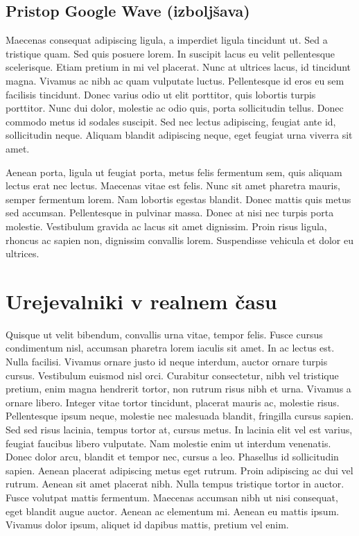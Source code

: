 \documentclass[a4paper, 12pt, twoside]{book}
\begin{document}
\section{Pristop Google Wave (izboljšava)	}

Maecenas consequat adipiscing ligula, a imperdiet ligula tincidunt ut. Sed a tristique quam. Sed quis posuere lorem. In suscipit lacus eu velit pellentesque scelerisque. Etiam pretium in mi vel placerat. Nunc at ultrices lacus, id tincidunt magna. Vivamus ac nibh ac quam vulputate luctus. Pellentesque id eros eu sem facilisis tincidunt. Donec varius odio ut elit porttitor, quis lobortis turpis porttitor. Nunc dui dolor, molestie ac odio quis, porta sollicitudin tellus. Donec commodo metus id sodales suscipit. Sed nec lectus adipiscing, feugiat ante id, sollicitudin neque. Aliquam blandit adipiscing neque, eget feugiat urna viverra sit amet.

Aenean porta, ligula ut feugiat porta, metus felis \cite{gdocs} fermentum sem, quis aliquam lectus erat nec lectus. Maecenas vitae est felis. Nunc sit amet pharetra mauris, semper fermentum lorem. Nam lobortis egestas blandit. Donec mattis quis metus sed accumsan. Pellentesque in pulvinar massa. Donec at nisi nec turpis porta molestie. Vestibulum gravida ac lacus sit amet dignissim. Proin risus ligula, rhoncus ac sapien non, dignissim convallis lorem. Suspendisse vehicula et dolor eu ultrices.

\chapter{Urejevalniki v realnem času}

Quisque ut velit bibendum, convallis urna vitae, tempor felis. Fusce cursus condimentum nisl, accumsan pharetra lorem iaculis sit amet. In ac lectus est. Nulla facilisi. Vivamus ornare justo id neque interdum, auctor ornare turpis cursus. Vestibulum euismod nisl orci. Curabitur consectetur, nibh vel tristique pretium, enim magna hendrerit tortor, non rutrum risus nibh et urna. Vivamus a ornare libero. Integer vitae tortor tincidunt, placerat mauris ac, molestie risus. Pellentesque ipsum neque, molestie nec malesuada blandit, fringilla cursus sapien. Sed sed risus lacinia, tempus tortor at, cursus metus. In lacinia elit vel est varius, feugiat faucibus libero vulputate. Nam molestie enim ut interdum venenatis. Donec dolor arcu, blandit et tempor nec, cursus a leo. Phasellus id sollicitudin sapien. Aenean placerat adipiscing metus eget rutrum. Proin adipiscing ac dui vel rutrum. Aenean sit amet placerat nibh. Nulla tempus tristique tortor in auctor. Fusce volutpat mattis fermentum. Maecenas accumsan nibh ut nisi consequat, eget blandit augue auctor. Aenean ac elementum mi. Aenean eu mattis ipsum. Vivamus dolor ipsum, aliquet id dapibus mattis, pretium vel enim.
\end{document}
